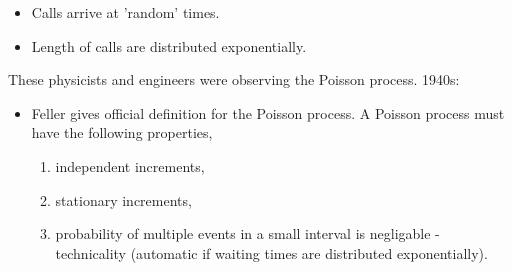 \documentclass{beamer}
\begin{document}
\begin{frame}
\begin{itemize}
    \begin{itemize}
    \item Calls arrive at 'random' times.
    \item Length of calls are distributed exponentially.
  \end{itemize}
  \pause
\end{itemize}
  These physicists and engineers were observing the Poisson process.
  1940s:
  \begin{itemize}
    \item Feller gives official definition for the Poisson process. A Poisson process must have the following properties,
    \begin{enumerate}
    \item independent increments,
    \item stationary increments,
    \item probability of multiple events in a small interval is negligable - technicality (automatic if waiting times are distributed exponentially).
    \end{enumerate}
  \end{itemize}
\end{frame}
\end{document}
